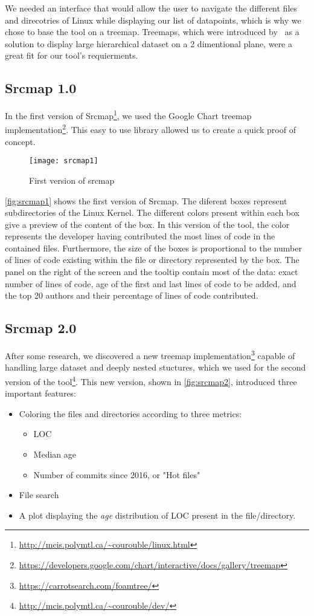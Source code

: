 We needed an interface that would allow the user to navigate the different files and direcotries of Linux while displaying our list of datapoints, which is why we chose to base the tool on a treemap. Treemaps, which were introduced by~\citep{Bederson-2002} as a solution to display large hierarchical dataset on a 2 dimentional plane, were a great fit for our tool's requierments. 

\subsection{Srcmap 1.0}

In the first version of Srcmap\footnote{\url{http://mcis.polymtl.ca/~courouble/linux.html}}, we used the Google Chart treemap implementation\footnote{\url{https://developers.google.com/chart/interactive/docs/gallery/treemap}}. This easy to use library allowed us to create a quick proof of concept. 

\begin{figure}[htb]
\centering
\texttt{[image: srcmap1]}
\caption{First version of srcmap}
\label{fig:srcmap1}
\end{figure}

\autoref{fig:srcmap1} shows the first version of Srcmap. The diferent boxes represent subdirectories of the Linux Kernel. The different colors present within each box give a preview of the content of the box. In this version of the tool, the color represents the developer having contributed the most lines of code in the contained files. Furthermore, the size of the boxes is proportional to the number of lines of code existing within the file or directory represented by the box. The panel on the right of the screen and the tooltip contain most of the data: exact number of lines of code, age of the first and last lines of code to be added, and the top 20 authors and their percentage of lines of code contributed.


\subsection{Srcmap 2.0}


After some research, we discovered a new treemap implementation\footnote{\url{https://carrotsearch.com/foamtree/}} capable of handling large dataset and deeply nested stuctures, which we used for the second version of the tool\footnote{\url{http://mcis.polymtl.ca/~courouble/dev/}}. This new version, shown in \autoref{fig:srcmap2}, introduced three important features: 
\begin{itemize}
	\item Coloring the files and directories according to three metrics:
	\begin{itemize}
		\item \ac{LOC}
		\item Median age
		\item Number of commits since 2016, or "Hot files"
	\end{itemize}
	\item File search
	\item A plot displaying the \textit{age} distribution of \ac{LOC} present in the file/directory.
\end{itemize}

